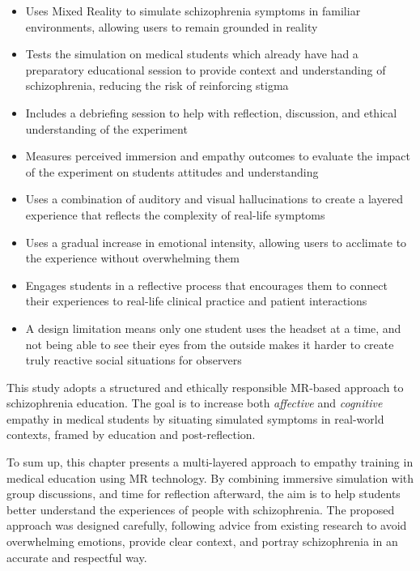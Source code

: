 \begin{itemize}
    \item Uses Mixed Reality to simulate schizophrenia symptoms in familiar environments, allowing users to remain grounded in reality
    \item Tests the simulation on medical students which already have had a preparatory educational session to provide context and understanding of schizophrenia, reducing the risk of reinforcing stigma
    \item Includes a debriefing session to help with reflection, discussion, and ethical understanding of the experiment
    \item Measures perceived immersion and empathy outcomes to evaluate the impact of the experiment on students attitudes and understanding
    \item Uses a combination of auditory and visual hallucinations to create a layered experience that reflects the complexity of real-life symptoms
    \item Uses a gradual increase in emotional intensity, allowing users to acclimate to the experience without overwhelming them
    \item Engages students in a reflective process that encourages them to connect their experiences to real-life clinical practice and patient interactions
    \item A design limitation means only one student uses the headset at a time, and not being able to see their eyes from the outside makes it harder to create truly reactive social situations for observers
\end{itemize}

This study adopts a structured and ethically responsible MR-based approach to schizophrenia education. The goal is to increase both \textit{affective} and \textit{cognitive} empathy in medical students by situating simulated symptoms in real-world contexts, framed by education and post-reflection. 

\vspace{1em}

To sum up, this chapter presents a multi-layered approach to empathy training in medical education using MR technology. By combining immersive simulation with group discussions, and time for reflection afterward, the aim is to help students better understand the experiences of people with schizophrenia. The proposed approach was designed carefully, following advice from existing research to avoid overwhelming emotions, provide clear context, and portray schizophrenia in an accurate and respectful way.
